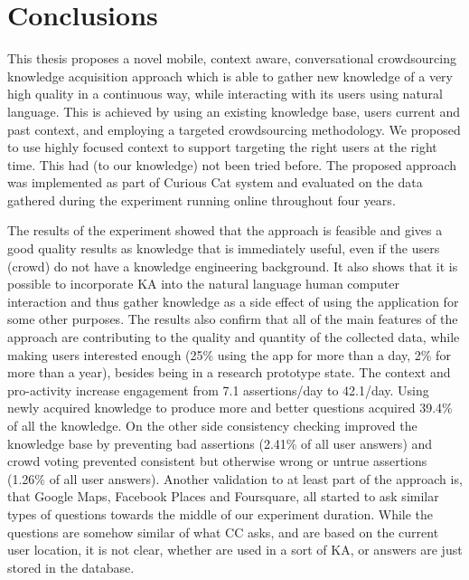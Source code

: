 % 
\chapter{Conclusions}
\label{chapter:conclusions}
This thesis proposes a novel mobile, context aware,
conversational crowdsourcing knowledge acquisition approach which is able to 
gather new knowledge of a very high quality in a continuous way, while 
interacting with its users using natural language. This is achieved by using an
existing knowledge base, users current and past context, and employing a 
targeted crowdsourcing methodology. We proposed to use highly focused context 
to support targeting the right users 
at the right time. This had (to our knowledge) not been tried before. The
proposed approach was implemented as part of Curious Cat system and evaluated 
on the data gathered during the experiment running online throughout four 
years. 

The results of the experiment showed that the approach is feasible and gives a 
good quality results as knowledge that is immediately useful, even if the users 
(crowd) do not have a knowledge engineering background. It also shows that
it is possible to incorporate KA into the natural language human computer interaction and 
thus gather knowledge as a side effect of using the application for some other
purposes. The results also confirm that all of the main features 
of the approach are contributing to the quality and quantity of the collected 
data, while making users interested enough (25\% using the app for more than a 
day, 2\% for more than a year), besides being in a research prototype state. 
The context and pro-activity increase engagement from 7.1 assertions/day to 
42.1/day. Using newly acquired knowledge to produce more and better questions 
acquired 39.4\% of all the knowledge. On the other side consistency checking 
improved the knowledge base by preventing bad assertions (2.41\% of all user 
answers) and crowd voting prevented consistent but otherwise wrong or untrue 
assertions (1.26\% of all user answers). Another validation to at least part
of the approach is, that Google Maps, Facebook Places and Foursquare, all 
started to ask similar types of questions towards the middle of our experiment
duration. While the questions are somehow similar of what CC asks, and are based
on the current user location, it is not clear, whether are used in a sort of KA,
or answers are just stored in the database.

